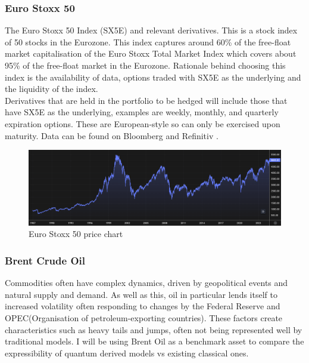 \documentclass[12pt]{article}
\numberwithin{equation}{section}
\begin{document}
\subsubsection{Euro Stoxx 50}
The Euro Stoxx 50 Index (SX5E) and relevant derivatives. This is a stock index of 50 stocks in the Eurozone. 
This index captures around 60\% of the free-float market capitalisation of the 
Euro Stoxx Total Market Index which covers about 95\% of the free-float market 
in the Eurozone\autocite{a2021_euro}. Rationale behind choosing this index is the availability of data,
options traded with SX5E as the underlying and the liquidity of the index.
\\
Derivatives that are held in the portfolio to be hedged will include those that 
have SX5E as the underlying, examples are weekly, monthly, and quarterly
expiration options. These are European-style so can only be exercised upon 
maturity. Data can be found on Bloomberg\autocite{bloomberg_2023_bloomberg} and Refinitiv
\autocite{lseg}.
\begin{figure}[h]
    \centering
    \includegraphics[scale=0.35]{sx5e.png}
    \caption{Euro Stoxx 50 price chart}
\end{figure}

\subsubsection{Brent Crude Oil}
Commodities often have complex dynamics, driven by geopolitical events and natural 
supply and demand. As well as this, oil in particular lends itself to increased
volatility often responding to changes by the Federal Reserve and OPEC(Organisation 
of petroleum-exporting countries). These factors create characteristics such as 
heavy tails and jumps, often not being represented well by traditional models. 
I will be using Brent Oil as a benchmark asset to compare the expressibility of 
quantum derived models vs existing classical ones. 
\end{document}
